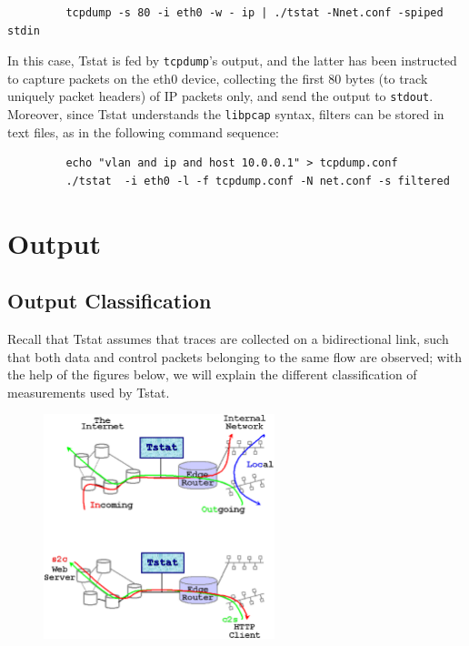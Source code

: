 \documentclass[11pt]{article}
\begin{document}
\begin{small}\begin{verbatim}
         tcpdump -s 80 -i eth0 -w - ip | ./tstat -Nnet.conf -spiped stdin
\end{verbatim}\end{small} \noindent
In this case, Tstat is fed by \texttt{tcpdump}'s output, and the latter has been
instructed to capture packets on the eth0 device, collecting the
first 80 bytes (to track uniquely packet headers) of IP packets only, 
and send the output to \texttt{stdout}. Moreover, since Tstat understands 
the \texttt{libpcap} syntax, filters can be stored in text files, as in 
the following command sequence:

\begin{small}\begin{verbatim}
         echo "vlan and ip and host 10.0.0.1" > tcpdump.conf
         ./tstat  -i eth0 -l -f tcpdump.conf -N net.conf -s filtered
\end{verbatim}\end{small} \noindent
\section{Output\label{Output}}
\subsection{Output Classification\label{Output_Classification}}


Recall that Tstat assumes that traces are collected on a bidirectional link,
such that both data and control packets belonging to the same flow are observed;
with the help of the figures below, we will explain the different classification
of measurements used by Tstat.



         \begin{figure}[!htb]
             \begin{center}
                 \includegraphics[width=0.6\textwidth]{tstat_output.eps}
             \end{center}
         \end{figure}
\end{document}
